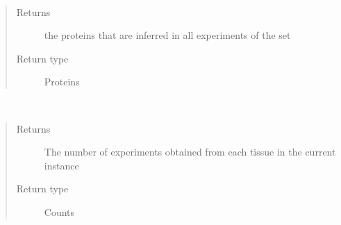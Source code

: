 \documentclass[letterpaper,10pt,english]{sphinxmanual}
\begin{document}
\begin{fulllineitems}
\begin{fulllineitems}
\end{fulllineitems}


\begin{fulllineitems}
\label{\detokenize{IPTK.Classes:IPTK.Classes.ExperimentalSet.ExperimentSet.get_proteins_present_in_all}}~\begin{quote}\begin{description}
\item[{Returns}] \leavevmode
the proteins that are inferred in all experiments of the set

\item[{Return type}] \leavevmode
Proteins

\end{description}\end{quote}

\end{fulllineitems}


\begin{fulllineitems}
\label{\detokenize{IPTK.Classes:IPTK.Classes.ExperimentalSet.ExperimentSet.get_tissue_counts}}~\begin{quote}\begin{description}
\item[{Returns}] \leavevmode
The number of experiments obtained from each tissue in the current instance

\item[{Return type}] \leavevmode
Counts

\end{description}\end{quote}

\end{fulllineitems}



\end{fulllineitems}
\end{document}
